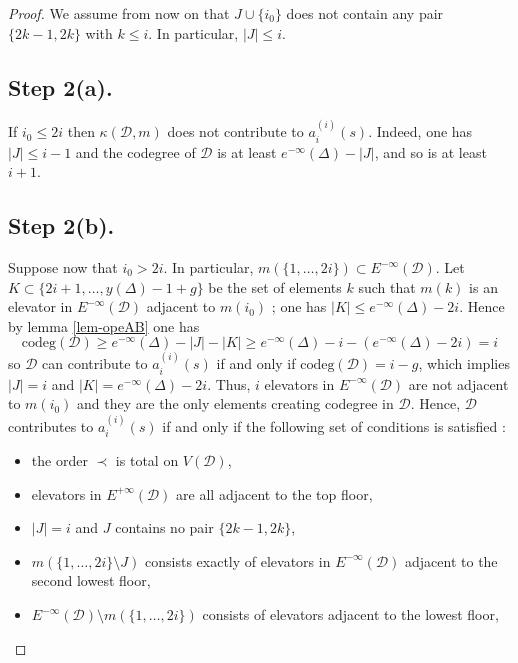 \documentclass[11pt]{article}
\theoremstyle{definition}
\numberwithin{equation}{section}
\newcommand{\nocontentsline}[3]{}
\newcommand{\tocless}[2]{\bgroup\let\addcontentsline=\nocontentsline#1{#2}\egroup}
\newcommand{\D}{\mathcal{D}}
\newcommand{\codeg}{\mathrm{codeg}}
\theoremstyle{plain}
\begin{document}
\begin{proof}
We assume from now on that $J\cup \{i_0\}$ does not contain any pair $\{2k-1,2k\}$ with $k\leqslant i$. In particular, $|J| \leqslant i$.



\tocless{\subsection*{Step 2(a).}}
If $i_0 \leqslant 2i$ then $\kappa(\D,m)$ does not contribute to $a_i^{(i)}(s)$.
Indeed, one has $|J| \leqslant i-1$ and the codegree of $\D$ is at least $e^{-\infty}(\Delta)-|J|$, and so is at least $i+1$.


\tocless{\subsection*{Step 2(b).}}
Suppose now that $i_0 > 2i$. In particular, $m(\{1,\dots,2i\}) \subset E^{-\infty}(\D)$. Let $K \subset \{ 2i+1,\dots, y(\Delta)-1 +g \}$ be the set of elements $k$ such that $m(k)$ is an elevator in $E^{-\infty}(\D)$ adjacent to $m(i_0)$ ; one has $|K| \leqslant e^{-\infty}(\Delta) - 2i$. Hence by lemma \ref{lem-opeAB} one has
\[ \codeg(\D) \geqslant e^{-\infty}(\Delta)  - |J| - |K| \geqslant e^{-\infty}(\Delta)  - i - (e^{-\infty}(\Delta) -2i) = i \]
so $\D$ can contribute to $a_i^{(i)}(s)$ if and only if $\codeg(\D) = i-g$, which implies $|J| = i$ and $|K| = e^{-\infty}(\Delta) -2i$. Thus, $i$ elevators in $E^{-\infty}(\D)$ are not adjacent to $m(i_0)$ and they are the only elements creating codegree in $\D$. Hence, $\D$ contributes to $a_i^{(i)}(s)$ if and only if the following set of conditions is satisfied :



\begin{itemize}
\item the order $\prec$ is total on $V(\D)$,

\item elevators in $E^{+\infty}(\D)$ are all adjacent to the top floor,

\item $|J| = i$ and $J$ contains no pair $\{2k-1, 2k\}$,

\item $m(\{1,\dots,2i\}\setminus J)$ consists exactly of elevators in $E^{-\infty}(\D)$ adjacent to the second lowest floor,

\item $E^{-\infty}(\D) \setminus m(\{ 1,\dots,2i \})$ consists of elevators adjacent to the lowest floor,


\end{itemize}
\end{proof}
\end{document}
